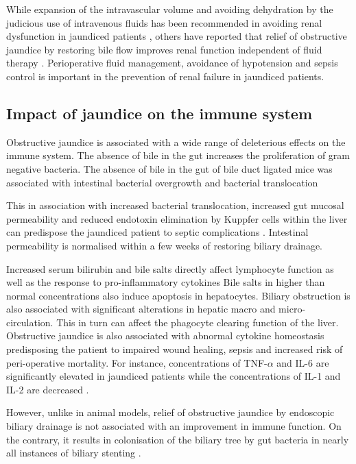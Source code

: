 While expansion of the intravascular volume and avoiding dehydration by the judicious use of intravenous fluids has been recommended in avoiding renal dysfunction in jaundiced patients \parencite{parks_prospective_1994}, others have reported that relief of obstructive jaundice by restoring bile flow improves renal function independent of fluid therapy \parencite{padillo_randomized_2005}. 
Perioperative fluid management, avoidance of hypotension and sepsis control is important in the prevention of renal failure in jaundiced patients.

\subsection{Impact of jaundice on the immune system}

Obstructive jaundice is associated with a wide range of deleterious effects on the immune system. 
The absence of bile in the gut increases the proliferation of gram negative bacteria. 
The absence of bile in the gut of bile duct ligated mice was associated with intestinal bacterial overgrowth and bacterial translocation \parencite{deitch_obstructive_1990}

This in association with increased bacterial translocation, increased gut mucosal permeability and reduced endotoxin elimination by Kuppfer cells within the liver can predispose the jaundiced patient to septic complications \parencite{nehez_compromise_2002}.
Intestinal permeability is normalised within a few weeks of restoring biliary drainage.

Increased serum bilirubin and bile salts directly affect lymphocyte function as well as the response to pro-inflammatory cytokines \parencite{scott-conner_pathophysiology_1994}
Bile salts in higher than normal concentrations also induce apoptosis in hepatocytes. 
Biliary obstruction is also associated with significant alterations in hepatic macro and micro-circulation. 
This in turn can affect the phagocyte clearing function of the liver. 
Obstructive jaundice is also associated with abnormal cytokine homeostasis predisposing the patient to impaired wound healing, sepsis and increased risk of peri-operative mortality. 
For instance, concentrations of TNF-$\alpha$ and IL-6 are significantly elevated in jaundiced patients while the concentrations of IL-1 and IL-2 are decreased \parencite{padillo_cytokines_2001}.

However, unlike in animal models, relief of obstructive jaundice by endoscopic biliary drainage is not associated with an improvement in immune function.
On the contrary, it results in colonisation of the biliary tree by gut bacteria in nearly all instances of biliary stenting \parencite{kimmings_endotoxin_2000}.


